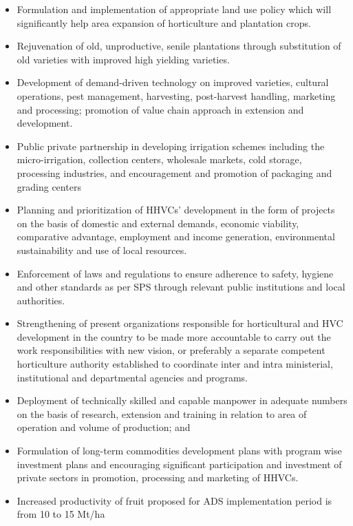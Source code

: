 \documentclass[
  openany]{book}
\providecommand{\tightlist}{%
  \setlength{\itemsep}{0pt}\setlength{\parskip}{0pt}}
\begin{document}
\begin{itemize}
\tightlist
\item
  Formulation and implementation of appropriate land use policy which will significantly help area expansion of horticulture and plantation crops.
\item
  Rejuvenation of old, unproductive, senile plantations through substitution of old varieties with improved high yielding varieties.
\item
  Development of demand-driven technology on improved varieties, cultural operations, pest management, harvesting, post-harvest handling, marketing and processing; promotion of value chain approach in extension and development.
\item
  Public private partnership in developing irrigation schemes including the micro-irrigation, collection centers, wholesale markets, cold storage, processing industries, and encouragement and promotion of packaging and grading centers
\item
  Planning and prioritization of HHVCs' development in the form of projects on the basis of domestic and external demands, economic viability, comparative advantage, employment and income generation, environmental sustainability and use of local resources.
\item
  Enforcement of laws and regulations to ensure adherence to safety, hygiene and other standards as per SPS through relevant public institutions and local authorities.
\item
  Strengthening of present organizations responsible for horticultural and HVC development in the country to be made more accountable to carry out the work responsibilities with new vision, or preferably a separate competent horticulture authority established to coordinate inter and intra ministerial, institutional and departmental agencies and programs.
\item
  Deployment of technically skilled and capable manpower in adequate numbers on the basis of research, extension and training in relation to area of operation and volume of production; and
\item
  Formulation of long-term commodities development plans with program wise investment plans and encouraging significant participation and investment of private sectors in promotion, processing and marketing of HHVCs.
\item
  Increased productivity of fruit proposed for ADS implementation period is from 10 to 15 Mt/ha
\end{itemize}
\end{document}
